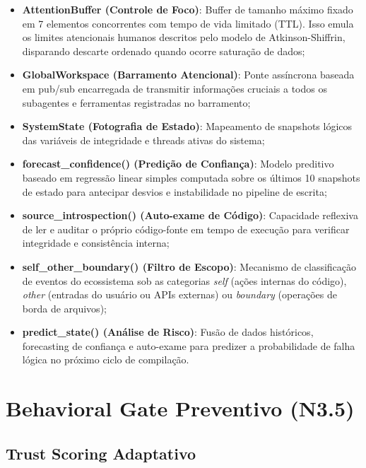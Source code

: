 \documentclass[12pt,a4paper,oneside]{abntex2}
\begin{document}
\begin{itemize}
    \item \textbf{AttentionBuffer (Controle de Foco)}: Buffer de tamanho máximo fixado em 7 elementos concorrentes com tempo de vida limitado (TTL). Isso emula os limites atencionais humanos descritos pelo modelo de Atkinson-Shiffrin, disparando descarte ordenado quando ocorre saturação de dados;
    \item \textbf{GlobalWorkspace (Barramento Atencional)}: Ponte assíncrona baseada em pub/sub encarregada de transmitir informações cruciais a todos os subagentes e ferramentas registradas no barramento;
    \item \textbf{SystemState (Fotografia de Estado)}: Mapeamento de snapshots lógicos das variáveis de integridade e threads ativas do sistema;
    \item \textbf{forecast\_confidence() (Predição de Confiança)}: Modelo preditivo baseado em regressão linear simples computada sobre os últimos 10 snapshots de estado para antecipar desvios e instabilidade no pipeline de escrita;
    \item \textbf{source\_introspection() (Auto-exame de Código)}: Capacidade reflexiva de ler e auditar o próprio código-fonte em tempo de execução para verificar integridade e consistência interna;
    \item \textbf{self\_other\_boundary() (Filtro de Escopo)}: Mecanismo de classificação de eventos do ecossistema sob as categorias \textit{self} (ações internas do código), \textit{other} (entradas do usuário ou APIs externas) ou \textit{boundary} (operações de borda de arquivos);
    \item \textbf{predict\_state() (Análise de Risco)}: Fusão de dados históricos, forecasting de confiança e auto-exame para predizer a probabilidade de falha lógica no próximo ciclo de compilação.
\end{itemize}

\chapter{Behavioral Gate Preventivo (N3.5)}
\label{ch:trust}

\section{Trust Scoring Adaptativo}
\end{document}
